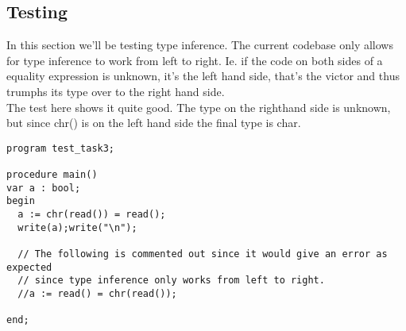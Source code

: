 \subsection{Testing}
In this section we'll be testing type inference. The current codebase only
allows for type inference to work from left to right. Ie. if the code on both
sides of a equality expression is unknown, it's the left hand side, that's the
victor and thus trumphs its type over to the right hand side.\\
The test here shows it quite good. The type on the righthand side is unknown,
but since chr() is on the left hand side the final type is char.


\begin{verbatim}
program test_task3;

procedure main()
var a : bool;
begin
  a := chr(read()) = read();
  write(a);write("\n");

  // The following is commented out since it would give an error as expected
  // since type inference only works from left to right.
  //a := read() = chr(read());

end;
\end{verbatim}
